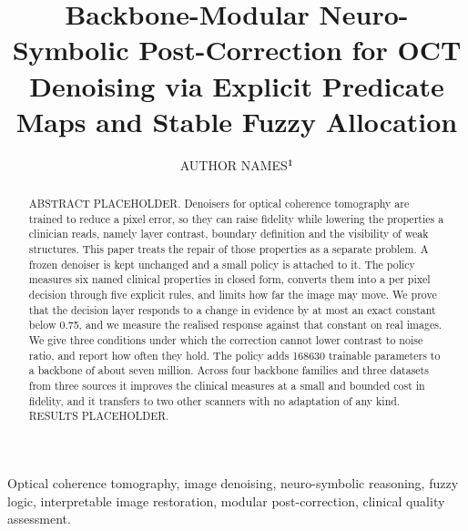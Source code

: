 \documentclass{ieeetj}
\def\authorrefmark#1{\ensuremath{^{\textbf{#1}}}}
\begin{document}
\receiveddate{}
\reviseddate{}
\accepteddate{}
\publisheddate{}
\currentdate{}
\doiinfo{}
\title{Backbone-Modular Neuro-Symbolic Post-Correction for OCT Denoising via Explicit Predicate Maps and Stable Fuzzy Allocation}
\author{AUTHOR NAMES\authorrefmark{1}}
\affil{\authorrefmark{1} AFFILIATION}

\begin{abstract}
ABSTRACT PLACEHOLDER. Denoisers for optical coherence tomography are trained to reduce a pixel
error, so they can raise fidelity while lowering the properties a clinician reads, namely layer
contrast, boundary definition and the visibility of weak structures. This paper treats the repair of
those properties as a separate problem. A frozen denoiser is kept unchanged and a small policy is
attached to it. The policy measures six named clinical properties in closed form, converts them into
a per pixel decision through five explicit rules, and limits how far the image may move. We prove
that the decision layer responds to a change in evidence by at most an exact constant below
\num{0.75}, and we measure the realised response against that constant on real images. We give three
conditions under which the correction cannot lower contrast to noise ratio, and report how often they
hold. The policy adds \num{168630} trainable parameters to a backbone of about seven million. Across
four backbone families and three datasets from three sources it improves the clinical measures at a
small and bounded cost in fidelity, and it transfers to two other scanners with no adaptation of any
kind. RESULTS PLACEHOLDER.
\end{abstract}

\begin{IEEEkeywords}
Optical coherence tomography, image denoising, neuro-symbolic reasoning, fuzzy logic, interpretable
image restoration, modular post-correction, clinical quality assessment.
\end{IEEEkeywords}

\maketitle












\end{document}

